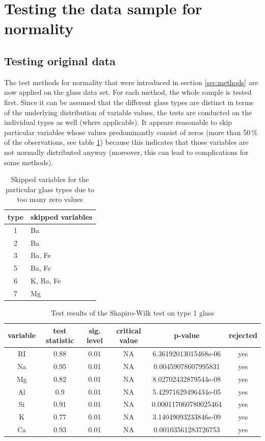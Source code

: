 \documentclass[a4paper, 12pt, titlepage, headsepline, listof = totoc, bibliography = totoc, numbers = noenddot]{scrartcl}
\begin{document}
\vfill


\newpage
\section{Testing the data sample for normality}\label{sec:testing}

\subsection{Testing original data}


The test methods for normality that were introduced in section \ref{sec:methods} are now applied on the glass data set. For each method, the whole sample is tested first. Since it can be assumed that the different glass types are distinct in terms of the underlying distribution of variable values, the tests are conducted on the individual types as well (where applicable). It appears reasonable to skip particular variables whose values predominantly consist of zeros (more than 50\,\% of the observations, see table \ref{tab:zeros}) because this indicates that those variables are not normally distributed anyway (moreover, this can lead to complications for some methods).

\begin{table}[h!]
\centering
\begin{tabular}{|cl|}
\hline
type & skipped variables\\
\hline
1 & Ba\\
2 & Ba\\
3 & Ba, Fe\\
5 & Ba, Fe\\
6 & K, Ba, Fe\\
7 & Mg\\
\hline
\end{tabular}
\caption{Skipped variables for the particular glass types due to too many zero values}
\label{tab:zeros}
\end{table}

\begin{table}[h!]
\centering
\begin{tabular}{|cccccc|} \hline variable & test statistic & sig. level & critical value & p-value & rejected\\ \hline RI & 0.88 & 0.01 & NA & 6.36192013015468e-06 & yes\\ 
Na & 0.95 & 0.01 & NA & 0.00459078607995831 & yes\\ 
Mg & 0.82 & 0.01 & NA & 8.02702432879544e-08 & yes\\ 
Al & 0.9 & 0.01 & NA & 5.42971629496434e-05 & yes\\ 
Si & 0.91 & 0.01 & NA & 0.000117060780025464 & yes\\ 
K & 0.77 & 0.01 & NA & 3.14049093233846e-09 & yes\\ 
Ca & 0.93 & 0.01 & NA & 0.00103561283726753 & yes\\ \hline \end{tabular}\caption{Test results of the Shapiro-Wilk test on type 1 glass}
\label{tab:testrestype1SW}
\end{table}
\end{document}
